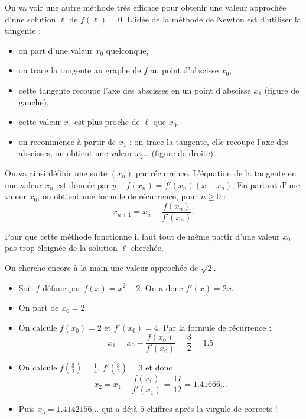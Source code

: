 \documentclass[11pt,class=report,crop=false]{standalone}
\begin{document}

\begin{cours}

	
On va voir une autre méthode très efficace pour obtenir une valeur approchée d'une solution $\ell$
de $f(\ell)=0$.
L'idée de la méthode de Newton est d'utiliser la tangente :
\begin{itemize} 
  \item on part d'une valeur $x_0$ quelconque,
  \item on trace la tangente au graphe de $f$ au point d'abscisse $x_0$,
  \item cette tangente recoupe l'axe des abscisses en un point d'abscisse $x_1$ (figure de gauche),
  \item cette valeur $x_1$ est plus proche de $\ell$ que $x_0$,
  \item on recommence à partir de $x_1$ : on trace la tangente, elle recoupe l'axe des abscisses, on obtient une valeur $x_2$\ldots{} (figure de droite).
\end{itemize}
  
  
On va ainsi définir une suite $(x_n)$ par récurrence.  
L'équation de la tangente en une valeur $x_n$ est donnée par 
$y-f(x_n) = f'(x_n)(x-x_n)$. En partant d'une valeur $x_0$, on obtient une formule de récurrence, pour $n\ge0$  :
$$x_{n+1} = x_n - \frac{f(x_n)}{f'(x_n)}.$$


Pour que cette méthode fonctionne il faut tout de même partir d'une valeur $x_0$ pas trop éloignée de la solution $\ell$ cherchée.

\begin{exemple}
On cherche encore \og{}à la main\fg{} une valeur approchée de $\sqrt{2}$.

\begin{itemize}
  \item Soit $f$ définie par $f(x)=x^2-2$. On a donc $f'(x) = 2x$.
  
  \item On part de $x_0=2$.
  
  \item On calcule $f(x_0) = 2$ et $f'(x_0) = 4$. Par la formule de récurrence :
  $$x_1 = x_0 - \frac{f(x_0)}{f'(x_0)} = \frac32 = 1.5$$
  
  \item On calcule $f(\frac32) = \frac14$, $f'(\frac32)=3$ et donc
  $$x_2 = x_1 - \frac{f(x_1)}{f'(x_1)} = \frac{17}{12} = 1.41666\ldots$$ 
  
  \item Puis $x_3 = 1.4142156\ldots$ qui a déjà $5$ chiffres après la virgule de corrects !
\end{itemize}

\end{exemple}

\end{cours}
\end{document}
